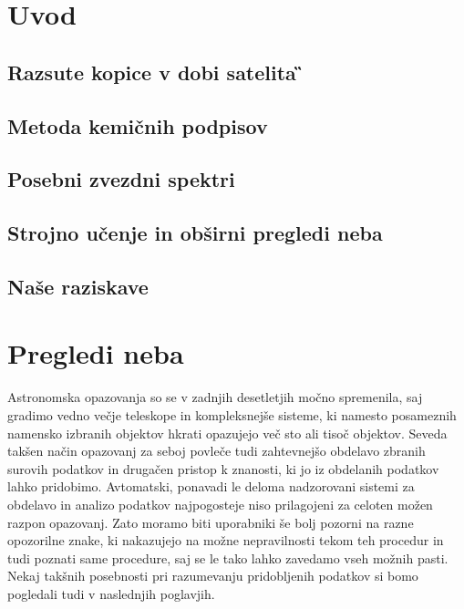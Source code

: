 
\section{Uvod}
\label{sec:slo_uvod}


\subsection{Razsute kopice v dobi satelita \G}

\subsection{Metoda kemičnih podpisov}

\subsection{Posebni zvezdni spektri}

\subsection{Strojno učenje in obširni pregledi neba}

\subsection{Naše raziskave}

\section{Pregledi neba}
\label{sec:slo_pregledi}
Astronomska opazovanja so se v zadnjih desetletjih močno spremenila, saj gradimo vedno večje teleskope in kompleksnejše sisteme, ki namesto posameznih namensko izbranih objektov hkrati opazujejo več sto ali tisoč objektov. Seveda takšen način opazovanj za seboj povleče tudi zahtevnejšo obdelavo zbranih surovih podatkov in drugačen pristop k znanosti, ki jo iz obdelanih podatkov lahko pridobimo. Avtomatski, ponavadi le deloma nadzorovani sistemi za obdelavo in analizo podatkov najpogosteje niso prilagojeni za celoten možen razpon opazovanj. Zato moramo biti uporabniki še bolj pozorni na razne opozorilne znake, ki nakazujejo na možne nepravilnosti tekom teh procedur in tudi poznati same procedure, saj se le tako lahko zavedamo vseh možnih pasti. Nekaj takšnih posebnosti pri razumevanju pridobljenih podatkov si bomo pogledali tudi v naslednjih poglavjih.

